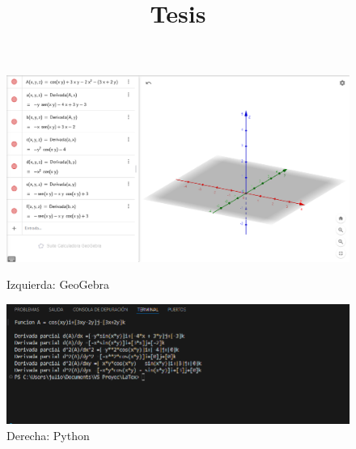 \documentclass{article}
\title{Tesis}
\begin{document}
\begin{figure}[h!]
    \centering
    \begin{minipage}{0.45\textwidth}
        \centering
        \includegraphics[width=\textwidth]{imgs/derivada_parcial_Geogebra.png}
        \caption*{Izquierda: GeoGebra}
    \end{minipage}
    \hfill
    \begin{minipage}{0.45\textwidth}
        \centering
        \includegraphics[width=\textwidth]{imgs/derivada_parcial_Python.png}
        \caption*{Derecha: Python}
    \end{minipage}
    
    \vspace{0.5cm}
    

\end{figure}
\end{document}
